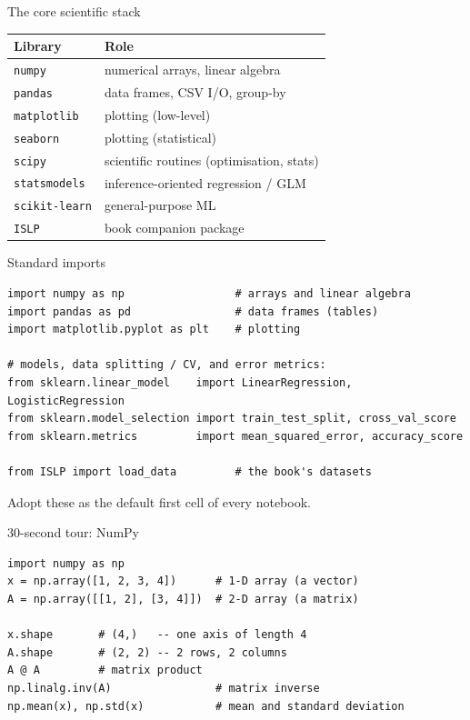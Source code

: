\documentclass[aspectratio=169,11pt]{beamer}
\begin{document}
\begin{frame}{The core scientific stack}
  \begin{tabular}{ll}
    \toprule
    \textbf{Library} & \textbf{Role} \\
    \midrule
    \texttt{numpy} & numerical arrays, linear algebra \\
    \texttt{pandas} & data frames, CSV I/O, group-by \\
    \texttt{matplotlib} & plotting (low-level) \\
    \texttt{seaborn} & plotting (statistical) \\
    \texttt{scipy} & scientific routines (optimisation, stats) \\
    \texttt{statsmodels} & inference-oriented regression / GLM \\
    \texttt{scikit-learn} & general-purpose ML \\
    \texttt{ISLP} & book companion package \\
    \bottomrule
  \end{tabular}
\end{frame}

\begin{frame}[fragile]{Standard imports}
  \begin{lstlisting}
import numpy as np                 # arrays and linear algebra
import pandas as pd                # data frames (tables)
import matplotlib.pyplot as plt    # plotting

# models, data splitting / CV, and error metrics:
from sklearn.linear_model    import LinearRegression, LogisticRegression
from sklearn.model_selection import train_test_split, cross_val_score
from sklearn.metrics         import mean_squared_error, accuracy_score

from ISLP import load_data         # the book's datasets
  \end{lstlisting}
  Adopt these as the default first cell of every notebook.
\end{frame}

\begin{frame}[fragile]{30-second tour: NumPy}
  \begin{lstlisting}
import numpy as np
x = np.array([1, 2, 3, 4])      # 1-D array (a vector)
A = np.array([[1, 2], [3, 4]])  # 2-D array (a matrix)

x.shape       # (4,)   -- one axis of length 4
A.shape       # (2, 2) -- 2 rows, 2 columns
A @ A         # matrix product
np.linalg.inv(A)                # matrix inverse
np.mean(x), np.std(x)           # mean and standard deviation
  \end{lstlisting}
\end{frame}
\end{document}
